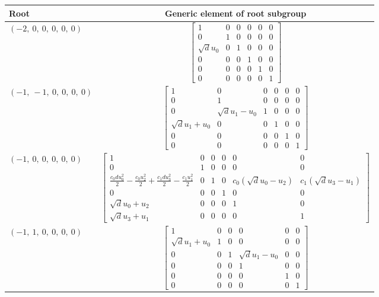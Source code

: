 \documentclass[11pt]{article}
\theoremstyle{definition}
\begin{document}
\noindent \begin{longtable}{|l|c|}
    \hline
    \textbf{Root} & \textbf{Generic element of root subgroup} \\
    \hline
    \endhead
    $\left( -2, \  0, \  0, \  0, \  0, \  0\right)$ & ${\left[\begin{matrix}1 & 0 & 0 & 0 & 0 & 0\\0 & 1 & 0 & 0 & 0 & 0\\\sqrt{d} u_{0} & 0 & 1 & 0 & 0 & 0\\0 & 0 & 0 & 1 & 0 & 0\\0 & 0 & 0 & 0 & 1 & 0\\0 & 0 & 0 & 0 & 0 & 1\end{matrix}\right]}$ \\
    \hline
    $\left( -1, \  -1, \  0, \  0, \  0, \  0\right)$ & ${\left[\begin{matrix}1 & 0 & 0 & 0 & 0 & 0\\0 & 1 & 0 & 0 & 0 & 0\\0 & \sqrt{d} u_{1} - u_{0} & 1 & 0 & 0 & 0\\\sqrt{d} u_{1} + u_{0} & 0 & 0 & 1 & 0 & 0\\0 & 0 & 0 & 0 & 1 & 0\\0 & 0 & 0 & 0 & 0 & 1\end{matrix}\right]}$ \\
    \hline
    $\left( -1, \  0, \  0, \  0, \  0, \  0\right)$ & ${\left[\begin{matrix}1 & 0 & 0 & 0 & 0 & 0\\0 & 1 & 0 & 0 & 0 & 0\\\frac{c_{0} d u_{0}^{2}}{2} - \frac{c_{0} u_{2}^{2}}{2} + \frac{c_{1} d u_{3}^{2}}{2} - \frac{c_{1} u_{1}^{2}}{2} & 0 & 1 & 0 & c_{0} \left(\sqrt{d} u_{0} - u_{2}\right) & c_{1} \left(\sqrt{d} u_{3} - u_{1}\right)\\0 & 0 & 0 & 1 & 0 & 0\\\sqrt{d} u_{0} + u_{2} & 0 & 0 & 0 & 1 & 0\\\sqrt{d} u_{3} + u_{1} & 0 & 0 & 0 & 0 & 1\end{matrix}\right]}$ \\
    \hline
    $\left( -1, \  1, \  0, \  0, \  0, \  0\right)$ & ${\left[\begin{matrix}1 & 0 & 0 & 0 & 0 & 0\\\sqrt{d} u_{1} + u_{0} & 1 & 0 & 0 & 0 & 0\\0 & 0 & 1 & \sqrt{d} u_{1} - u_{0} & 0 & 0\\0 & 0 & 0 & 1 & 0 & 0\\0 & 0 & 0 & 0 & 1 & 0\\0 & 0 & 0 & 0 & 0 & 1\end{matrix}\right]}$ \\

\end{longtable}
\end{document}
